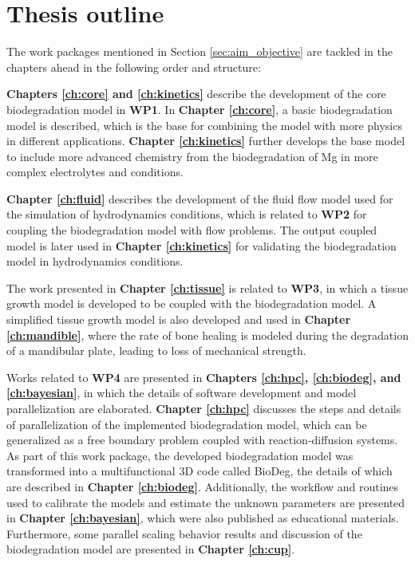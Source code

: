 \section{Thesis outline}

The work packages mentioned in Section \ref{sec:aim_objective} are tackled in the chapters ahead in the following order and structure: 

\textbf{Chapters \ref{ch:core} and \ref{ch:kinetics}} describe the development of the core biodegradation model in \textbf{WP1}. In \textbf{Chapter \ref{ch:core}}, a basic biodegradation model is described, which is the base for combining the model with more physics in different applications. \textbf{Chapter \ref{ch:kinetics}} further develops the base model to include more advanced chemistry from the biodegradation of Mg in more complex electrolytes and conditions. 

\textbf{Chapter \ref{ch:fluid}} describes the development of the fluid flow model used for the simulation of hydrodynamics conditions, which is related to \textbf{WP2} for coupling the biodegradation model with flow problems. The output coupled model is later used in \textbf{Chapter \ref{ch:kinetics}} for validating the biodegradation model in hydrodynamics conditions. 

The work presented in \textbf{Chapter \ref{ch:tissue}} is related to \textbf{WP3}, in which a tissue growth model is developed to be coupled with the biodegradation model. A simplified tissue growth model is also developed and used in \textbf{Chapter \ref{ch:mandible}}, where the rate of bone healing is modeled during the degradation of a mandibular plate, leading to loss of mechanical strength. 

Works related to \textbf{WP4} are presented in \textbf{Chapters \ref{ch:hpc}, \ref{ch:biodeg}, and \ref{ch:bayesian}}, in which the details of software development and model parallelization are elaborated. \textbf{Chapter \ref{ch:hpc}} discusses the steps and details of parallelization of the implemented biodegradation model, which can be generalized as a free boundary problem coupled with reaction-diffusion systems. As part of this work package, the developed biodegradation model was transformed into a multifunctional 3D code called BioDeg, the details of which are described in \textbf{Chapter \ref{ch:biodeg}}. Additionally, the workflow and routines used to calibrate the models and estimate the unknown parameters are presented in \textbf{Chapter \ref{ch:bayesian}}, which were also published as educational materials. Furthermore, some parallel scaling behavior results and discussion of the biodegradation model are presented in \textbf{Chapter \ref{ch:cup}}.

